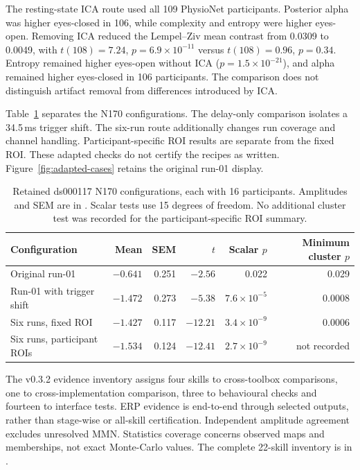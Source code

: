 The resting-state ICA route used all 109 PhysioNet participants. Posterior alpha was higher eyes-closed in 106, while complexity and entropy were higher eyes-open. Removing ICA reduced the Lempel--Ziv mean contrast from 0.0309 to 0.0049, with \(t(108)=7.24\), \(p=6.9\times10^{-11}\) versus \(t(108)=0.96\), \(p=0.34\). Entropy remained higher eyes-open without ICA (\(p=1.5\times10^{-21}\)), and alpha remained higher eyes-closed in 106 participants. The comparison does not distinguish artifact removal from differences introduced by ICA.

Table~\ref*{tab:adapted-n170} separates the N170 configurations. The delay-only comparison isolates a 34.5\,ms trigger shift. The six-run route additionally changes run coverage and channel handling. Participant-specific ROI results are separate from the fixed ROI. These adapted checks do not certify the recipes as written. Figure~\ref*{fig:adapted-cases} retains the original run-01 display.
\begin{table}[!htbp]
\centering\small
\caption{Retained ds000117 N170 configurations, each with 16 participants. Amplitudes and SEM are in \uV{}. Scalar tests use 15 degrees of freedom. No additional cluster test was recorded for the participant-specific ROI summary.}
\label{tab:adapted-n170}
\begin{tabular}{>{\raggedright\arraybackslash}p{4.7cm}rrrrr}
\toprule
Configuration & Mean & SEM & \(t\) & Scalar \(p\) & Minimum cluster \(p\)\\
\midrule
Original run-01 & \(-0.641\) & 0.251 & \(-2.56\) & 0.022 & 0.029\\
Run-01 with trigger shift & \(-1.472\) & 0.273 & \(-5.38\) & \(7.6\times10^{-5}\) & 0.0008\\
Six runs, fixed ROI & \(-1.427\) & 0.117 & \(-12.21\) & \(3.4\times10^{-9}\) & 0.0006\\
Six runs, participant ROIs & \(-1.534\) & 0.124 & \(-12.41\) & \(2.7\times10^{-9}\) & not recorded\\
\bottomrule
\end{tabular}
\end{table}

The v0.3.2 evidence inventory assigns four skills to cross-toolbox comparisons, one to cross-implementation comparison, three to behavioural checks and fourteen to interface tests. ERP evidence is end-to-end through selected outputs, rather than stage-wise or all-skill certification. Independent amplitude agreement excludes unresolved MMN. Statistics coverage concerns observed maps and memberships, not exact Monte-Carlo values. The complete 22-skill inventory is in .

